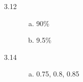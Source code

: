 \documentclass[landscape]{exam}
\begin{document}
\begin{description}
    \item[3.12]
      \begin{enumerate}[(a)]
        \item 90\%
        \item 9.5\%
      \end{enumerate}

    \item[3.14]
      \begin{enumerate}[(a)]
        \item 0.75, 0.8, 0.85
      \end{enumerate}
  \end{description}
  
\end{document}
